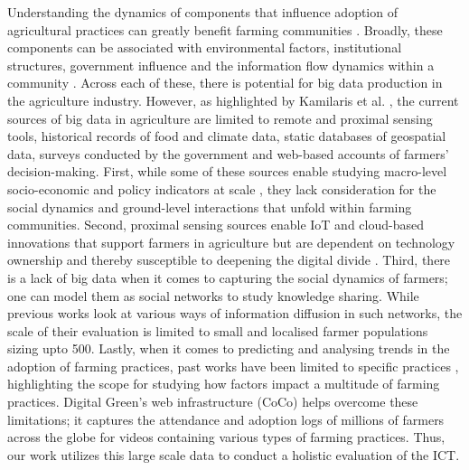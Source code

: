 \documentclass[manuscript,screen]{acmart}
\begin{document}
Understanding the dynamics of components that influence adoption of agricultural practices can greatly benefit farming communities \cite{mittalagricultural_informationnetworks, adoption_agriculture_innovations, farmer_adoption_review_synthesis}. Broadly, these components can be associated with environmental factors, institutional structures, government influence and the information flow dynamics within a community \cite{categorisation_factors_adoptions}. Across each of these, there is potential for big data production in the agriculture industry. However, as highlighted by Kamilaris et al. \cite{big_data_analytics_review}, the current sources of big data in agriculture are limited to remote and proximal sensing tools, historical records of food and climate data, static databases of geospatial data, surveys conducted by the government and web-based accounts of farmers’ decision-making. First, while some of these sources enable studying macro-level socio-economic and policy indicators at scale \cite{land_use_socioeconomic, socioeconomic_determinants_grass_kenya, socioeconomic_factors_india}, they lack consideration for the social dynamics and ground-level interactions that unfold within farming communities. Second, proximal sensing sources enable IoT and cloud-based innovations that support farmers in agriculture \cite{big_data_analytics_review, OrganizedDA_pride_model} but are dependent on technology ownership and thereby susceptible to deepening the digital divide \cite{promises_pitfalls_ict_agriculture, social_inequalities_india}. Third, there is a lack of big data when it comes to capturing the social dynamics of farmers; one can model them as social networks to study knowledge sharing. While previous works \cite{farmers_social_networks_myanmar, social_networks_ghana, measuring_social_networks} look at various ways of information diffusion in such networks, the scale of their evaluation is limited to small and localised farmer populations sizing upto 500. Lastly, when it comes to predicting and analysing trends in the adoption of farming practices, past works have been limited to specific practices \cite{promoting_adoption, forecasting_irrigation}, highlighting the scope for studying how factors impact a multitude of farming practices. Digital Green’s web infrastructure (CoCo) helps overcome these limitations; it captures the attendance and adoption logs of millions of farmers across the globe for videos containing various types of farming practices. Thus, our work utilizes this large scale data to conduct a holistic evaluation of the ICT.
\end{document}
